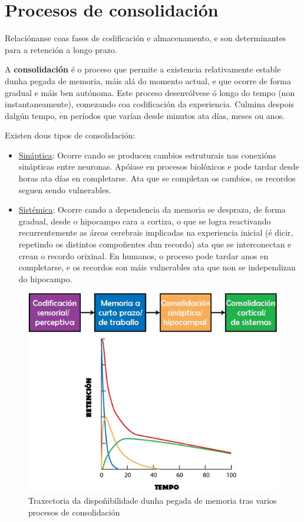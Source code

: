 \documentclass[a4paper,11pt]{article}
\begin{document}
\section{Procesos de consolidación}
Relaciónanse coas fases de codificación e almacenamento, e son determinantes para a retención a longo prazo.

A \textbf{consolidación} é o proceso que permite a existencia relativamente estable dunha pegada de memoria, máis alá do momento actual, e que ocorre de forma gradual e máis ben autónoma. Este proceso desenvólvese ó longo do tempo (non instantaneamente), comezando coa codificación da experiencia. Culmina despois dalgún tempo, en períodos que varían desde minutos ata días, meses ou anos.

Existen dous tipos de consolidación:
\begin{itemize}
	\item \underline{Sináptica}: Ocorre cando se producen cambios estruturais nas conexións
	sinápticas entre neuronas. Apóiase en procesos biolóxicos e pode tardar desde horas ata días en
	completarse. Ata que se completan os cambios, os recordos seguen sendo vulnerables. 
	\item \underline{Sistémica}: Ocorre cando a dependencia da memoria se despraza, de forma gradual,
	desde o hipocampo cara a cortiza, o que se logra reactivando recurrentemente as áreas cerebrais
	implicadas na experiencia inicial (é dicir, repetindo os distintos compoñentes dun recordo) ata 
	que se interconectan e crean o recordo orixinal. En humanos, o proceso pode tardar anos en
	completarse, e os recordos son máis vulnerables ata que non se independizan do hipocampo.
\end{itemize}

\begin{figure}[h!]
	\centering
	\includegraphics[width=0.45\linewidth]{memoria3_1}
	\caption{Traxectoria da dispoñibilidade dunha pegada de memoria tras varios procesos de 				consolidación}
\end{figure}
\end{document}
